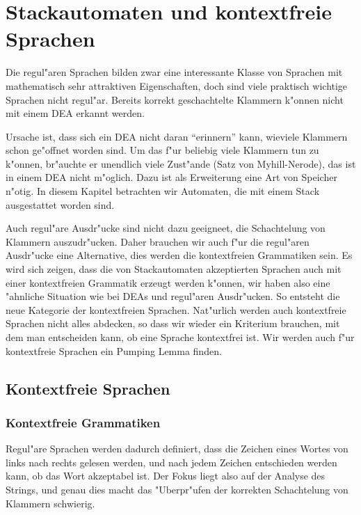 %
%
\chapter{Stackautomaten und kontextfreie Sprachen\label{chapter-cfl}}
Die regul"aren Sprachen bilden zwar eine interessante Klasse
von Sprachen mit mathematisch sehr attraktiven Eigenschaften,
doch sind viele praktisch wichtige Sprachen nicht regul"ar.
Bereits korrekt geschachtelte Klammern k"onnen nicht mit einem
DEA erkannt werden.

Ursache ist, dass sich ein DEA nicht
daran ``erinnern'' kann, wieviele Klammern schon ge"offnet
worden sind. Um das f"ur beliebig viele Klammern tun zu k"onnen,
br"auchte er unendlich viele Zust"ande (Satz von Myhill-Nerode),
das ist in einem DEA nicht m"oglich. Dazu ist als Erweiterung
eine Art von Speicher n"otig. In diesem Kapitel betrachten
wir Automaten, die mit einem Stack ausgestattet worden sind.

Auch regul"are Ausdr"ucke sind nicht dazu geeigneet, die Schachtelung
von Klammern auszudr"ucken. Daher brauchen wir auch f"ur die
regul"aren Ausdr"ucke eine Alternative, dies werden die kontextfreien
Grammatiken sein. Es wird sich zeigen, dass die von Stackautomaten
akzeptierten Sprachen auch mit einer kontextfreien Grammatik erzeugt
werden k"onnen, wir haben also eine "ahnliche Situation wie
bei DEAs und regul"aren Ausdr"ucken. So entsteht die neue
Kategorie der kontextfreien Sprachen.
Nat"urlich werden auch kontextfreie Sprachen nicht alles
abdecken, so dass wir wieder ein Kriterium brauchen, mit dem
man entscheiden kann, ob eine Sprache kontextfrei ist. Wir
werden auch f"ur kontextfreie Sprachen
ein Pumping Lemma finden.

\section{Kontextfreie Sprachen}
\subsection{Kontextfreie Grammatiken}
Regul"are Sprachen werden dadurch definiert, dass die Zeichen
eines Wortes von links nach rechts gelesen werden, und nach jedem
Zeichen entschieden werden kann, ob das Wort akzeptabel ist.
Der Fokus liegt also auf der Analyse des Strings, und genau dies
macht das "Uberpr"ufen der korrekten Schachtelung von Klammern
schwierig. 

